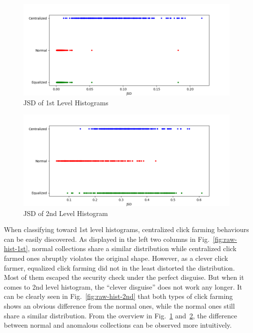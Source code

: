 \documentclass[a4paper]{IEEEtran}
\begin{document}
			\begin{figure}[!ht]
				\centering
				\includegraphics[width=\linewidth]{fig/RawOverview1st.png}
				\caption{JSD of 1st Level Histograms}
				\label{fig:raw-overview-1st}
			\end{figure}
			
			\begin{figure}[!ht]
				\centering
				\includegraphics[width=\linewidth]{fig/RawOverview2nd.png}
				\caption{JSD of 2nd Level Histogram}
				\label{fig:raw-overview-2nd}
			\end{figure}
			
			When classifying toward 1st level histograms, centralized click farming behaviours can be easily discovered. As displayed in the left two columns in Fig.~\ref{fig:raw-hist-1st}, normal collections share a similar distribution while centralized click farmed ones abruptly violates the original shape. However, as a clever click farmer, equalized click farming did not in the least distorted the distribution. Most of them escaped the security check under the perfect disguise.
			But when it comes to 2nd level histogram, the ``clever disguise'' does not work any longer. It can be clearly seen in Fig.~\ref{fig:raw-hist-2nd} that both types of click farming shows an obvious difference from the normal ones, while the normal ones still share a similar distribution.
			From the overview in Fig.~\ref{fig:raw-overview-1st} and~\ref{fig:raw-overview-2nd}, the difference between normal and anomalous collections can be observed more intuitively.
			
\end{document}
